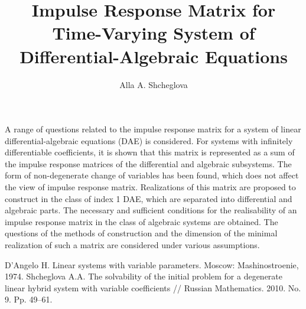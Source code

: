 \title{Impulse Response Matrix for Time-Varying System of Differential-Algebraic Equations}
\author{Alla A. Shcheglova}


\maketitle

\begin{abstract}
\end{abstract}


A range of questions related to the impulse response matrix \cite{reff1} for a system of linear differential-algebraic equations (DAE) \cite{reff2} is considered. For systems with infinitely differentiable coefficients, it is shown that this matrix is represented as a sum of the impulse response matrices of the differential and algebraic subsystems.  The form of  non-degenerate change of variables has been found, which does not affect the view of impulse response matrix.  Realizations of this matrix are proposed to construct  in the class of index 1 DAE, which are separated into differential and algebraic parts. The necessary and sufficient conditions for the realisability  of an impulse response matrix in the class of algebraic systems are obtained. The questions of the methods of construction and  the dimension of the minimal realization of such a matrix are considered under various assumptions.

\begin{thebibliography}{9}
 { D'Angelo H.} Linear systems with variable parameters.  Moscow:  Mashinostroenie, 1974.  
 { Shcheglova A.A.} The solvability of the initial problem for a degenerate linear hybrid system with variable coefficients // Russian Mathematics.  2010. No. 9.  Pp. 49--61.  
\end{thebibliography}
